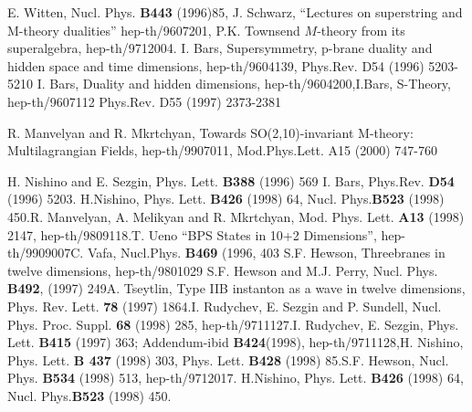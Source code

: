 \documentclass[a4paper,12pt]{article}
\begin{document}
\begin{thebibliography}{99}
  E. Witten, Nucl. Phys. \textbf{B443} (1996)85,\newline
J. Schwarz, ``Lectures on superstring and M-theory dualities''
hep-th/9607201,\newline
 P.K. Townsend $M$-theory from its superalgebra,
hep-th/9712004.
 I. Bars, Supersymmetry, p-brane duality and hidden space
and time dimensions, hep-th/9604139, Phys.Rev. D54 (1996)
5203-5210 \newline I. Bars, Duality and hidden dimensions,
hep-th/9604200,\newline I.Bars, S-Theory, hep-th/9607112 Phys.Rev.
D55 (1997) 2373-2381

  R. Manvelyan and R. Mkrtchyan, Towards SO(2,10)-invariant
M-theory: Multilagrangian Fields, hep-th/9907011, Mod.Phys.Lett.
A15 (2000) 747-760

  H. Nishino and E. Sezgin, Phys. Lett. \textbf{B388} (1996)
569 \newline I. Bars, Phys.Rev. \textbf{D54} (1996) 5203. \newline
H.Nishino, Phys. Lett. \textbf{B426} (1998) 64, Nucl.
Phys.\textbf{B523} (1998) 450.\newline R. Manvelyan, A. Melikyan
and R. Mkrtchyan, Mod. Phys. Lett. \textbf{A13} (1998) 2147,
hep-th/9809118.\newline T. Ueno ``BPS States in 10+2 Dimensions'',
hep-th/9909007\newline C. Vafa, Nucl.Phys. \textbf{B469} (1996,
403 \newline S.F. Hewson, Threebranes in twelve dimensions,
hep-th/9801029
\newline S.F. Hewson and M.J. Perry, Nucl. Phys. \textbf{B492},
(1997) 249\newline A. Tseytlin, Type IIB instanton as a wave in
twelve dimensions, Phys. Rev. Lett. \textbf{78} (1997)
1864.\newline I. Rudychev, E. Sezgin and P. Sundell, Nucl. Phys.
Proc. Suppl. \textbf{68} (1998) 285, hep-th/9711127.\newline I.
Rudychev, E. Sezgin, Phys. Lett. \textbf{B415} (1997) 363;
Addendum-ibid \textbf{B424}(1998), hep-th/9711128,\newline H.
Nishino, Phys. Lett. \textbf{B 437} (1998) 303, Phys. Lett.
\textbf{B428} (1998) 85.\newline S.F. Hewson, Nucl. Phys.
\textbf{B534} (1998) 513, hep-th/9712017.
\newline H.Nishino, Phys. Lett. \textbf{B426} (1998) 64, Nucl. Phys.\textbf{B523}
(1998) 450.


\end{thebibliography}
\end{document}
